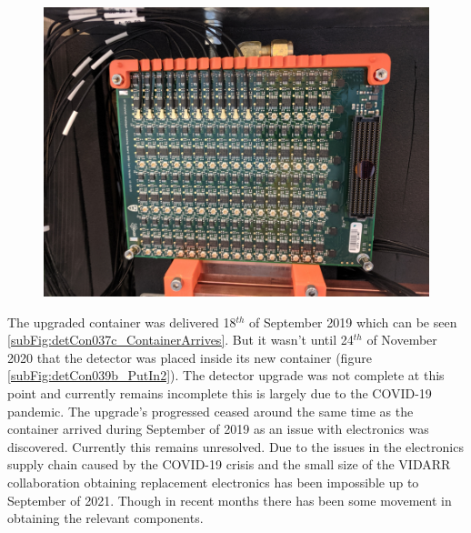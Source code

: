 \begin{figure}[htbp]
\centering
\includegraphics[width=0.8\linewidth]{Chapter3/Figs/Raster/detCon032_ConnectedBoard.png}
\label{fig:detCon032_ConnectedBoard}
\end{figure}

The upgraded container was delivered 18$^{th}$ of September 2019 which can be seen \ref{subFig:detCon037c_ContainerArrives}. But it wasn't until 24$^{th}$ of November 2020 that the detector was placed inside its new container (figure \ref{subFig:detCon039b_PutIn2}). The detector upgrade was not complete at this point and currently remains incomplete this is largely due to the COVID-19 pandemic. The upgrade's progressed ceased around the same time as the container arrived during September of 2019 as an issue with electronics was discovered. Currently this remains unresolved. Due to the issues in the electronics supply chain caused by the COVID-19 crisis and the small size of the VIDARR collaboration obtaining replacement electronics has been impossible up to September of 2021. Though in recent months there has been some movement in obtaining the relevant components. 

